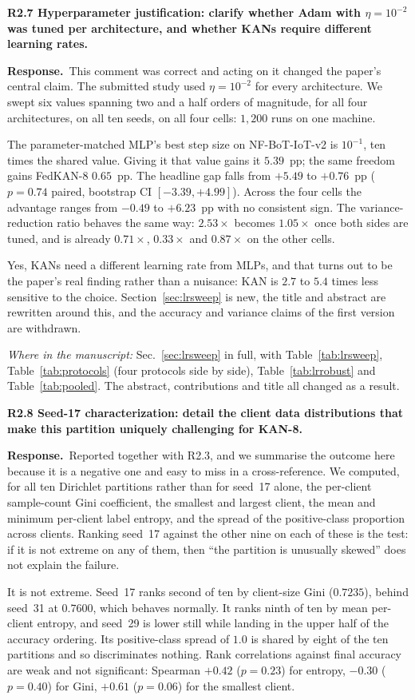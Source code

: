 \documentclass[11pt]{article}
\newcommand{\rc}[1]{\medskip\noindent\textbf{\textcolor[rgb]{0.35,0.35,0.35}{#1}}\par\nopagebreak}
\newcommand{\reply}{\medskip\noindent\textbf{Response.}\ }
\newcommand{\where}[1]{\par\smallskip\noindent\emph{Where in the manuscript:} #1\par}
\begin{document}
\rc{R2.7 Hyperparameter justification: clarify whether Adam with $\eta = 10^{-2}$ was
tuned per architecture, and whether KANs require different learning rates.}
\reply This comment was correct and acting on it changed the paper's central claim. The submitted
study used $\eta=10^{-2}$ for every architecture. We swept six values spanning two and a half
orders of magnitude, for all four architectures, on all ten seeds, on all four cells:
$1{,}200$ runs on one machine.

The parameter-matched MLP's best step size on NF-BoT-IoT-v2 is $10^{-1}$, ten times the shared
value. Giving it that value gains it $5.39$~pp; the same freedom gains FedKAN-8 $0.65$~pp. The
headline gap falls from $+5.49$ to $+0.76$~pp ($p=0.74$ paired, bootstrap CI
$[-3.39,+4.99]$). Across the four cells the advantage ranges from $-0.49$ to $+6.23$~pp with
no consistent sign. The variance-reduction ratio behaves the same way: $2.53\times$ becomes
$1.05\times$ once both sides are tuned, and is already $0.71\times$, $0.33\times$ and
$0.87\times$ on the other cells.

Yes, KANs need a different learning rate from MLPs, and that turns out to be the paper's real
finding rather than a nuisance: KAN is $2.7$ to $5.4$ times less sensitive to the choice.
Section~\ref{sec:lrsweep} is new, the title and abstract are rewritten around this, and the
accuracy and variance claims of the first version are withdrawn.
\where{Sec.~\ref{sec:lrsweep} in full, with Table~\ref{tab:lrsweep}, Table~\ref{tab:protocols} (four protocols side by side), Table~\ref{tab:lrrobust} and Table~\ref{tab:pooled}. The abstract, contributions and title all changed as a result.}

\rc{R2.8 Seed-17 characterization: detail the client data distributions that make this
partition uniquely challenging for KAN-8.}
\reply Reported together with R2.3, and we summarise the outcome here because it is a negative one and
easy to miss in a cross-reference. We computed, for all ten Dirichlet partitions rather than for
seed~17 alone, the per-client sample-count Gini coefficient, the smallest and largest client, the
mean and minimum per-client label entropy, and the spread of the positive-class proportion across
clients. Ranking seed~17 against the other nine on each of these is the test: if it is not extreme
on any of them, then ``the partition is unusually skewed'' does not explain the failure.

It is not extreme. Seed~17 ranks second of ten by client-size Gini ($0.7235$), behind seed~31 at
$0.7600$, which behaves normally. It ranks ninth of ten by mean per-client entropy, and seed~29
is lower still while landing in the upper half of the accuracy ordering. Its positive-class spread
of $1.0$ is shared by eight of the ten partitions and so discriminates nothing. Rank correlations
against final accuracy are weak and not significant: Spearman $+0.42$ ($p=0.23$) for entropy,
$-0.30$ ($p=0.40$) for Gini, $+0.61$ ($p=0.06$) for the smallest client.
\end{document}
